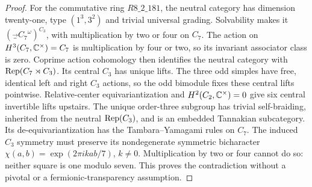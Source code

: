 \begin{proof}
For the commutative ring $R8\_2\_181$, the neutral category has
dimension twenty-one, type $(1^3,3^2)$ and trivial universal grading.
Solvability makes it $(\Vec_{C_7}^\omega)^{C_3}$, with multiplication
by two or four on $C_7$. The action on
$H^3(C_7,\mathbb C^\times)=C_7$ is multiplication by four or two, so its
invariant associator class is zero. Coprime action cohomology then
identifies the neutral category with $\operatorname{Rep}(C_7\rtimes C_3)$.
Its central $C_3$ has unique lifts. The three odd simples have free,
identical left and right $C_3$ actions, so the odd bimodule fixes these
central lifts pointwise. Relative-center equivariantization
\cite{GNN} and $H^2(C_2,\mathbb C^\times)=0$ give six central invertible
lifts upstairs. The unique order-three subgroup has trivial
self-braiding, inherited from the neutral $\operatorname{Rep}(C_3)$, and is an
embedded Tannakian subcategory. Its de-equivariantization has the
Tambara--Yamagami rules on $C_7$. The induced $C_3$ symmetry must
preserve its nondegenerate symmetric bicharacter
$\chi(a,b)=\exp(2\pi i kab/7)$, $k\ne0$. Multiplication by two or
four cannot do so: neither square is one modulo seven. This proves
the contradiction without a pivotal or a fermionic-transparency
assumption.
\end{proof}

